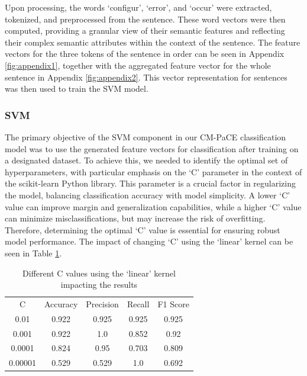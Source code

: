 \documentclass[english,bachelor]{swsLeipzig}
\begin{document}
Upon processing, the words `configur', `error', and `occur' were extracted, tokenized, and preprocessed 
from the sentence. These word vectors were then computed, providing a granular view of their semantic features and reflecting their complex semantic attributes within the context of the sentence. The feature vectors for the three tokens of the sentence in order can be seen in Appendix \ref{fig:appendix1}, together with the aggregated feature vector for the whole sentence in Appendix \ref{fig:appendix2}. This vector representation for sentences was then used to train the SVM model.

\subsubsection{SVM}

The primary objective of the SVM component in our CM-PaCE classification model was to use the generated feature vectors for classification after training on a designated dataset. To achieve this, we needed to identify the optimal set of hyperparameters, with particular emphasis on the `C' parameter in the context of the scikit-learn Python library. This parameter is a crucial factor in regularizing the model, balancing classification accuracy with model simplicity. A lower `C' value can improve margin and generalization capabilities, while a higher `C' value can minimize misclassifications, but may increase the risk of overfitting. Therefore, determining the optimal `C' value is essential for ensuring robust model performance. The impact of changing `C' using the `linear' kernel can be seen in Table \ref{tab:table50}.

\begin{table}[ht]
  \caption{Different C values using the `linear' kernel impacting the results}
  \centering
  \begin{tabular}{ccccc}\toprule
  C & Accuracy & Precision & Recall & F1 Score \\ \cmidrule(l){2-5}
  0.01    & 0.922       & 0.925       & 0.925 & 0.925 \\
  0.001  & 0.922  & 1.0  & 0.852 & 0.92 \\
  0.0001  & 0.824       & 0.95       & 0.703 & 0.809 \\
  0.00001    & 0.529       & 0.529       & 1.0 & 0.692 \\\bottomrule
  \end{tabular}
  \label{tab:table50}
\end{table}
\end{document}
